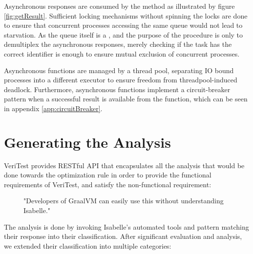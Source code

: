 Asynchronous responses are consumed by the  method as illustrated by figure \ref{fig:getResult}. Sufficient locking 
mechanisms without spinning the locks are done to ensure that concurrent processes accessing the same queue would not lead to starvation.
As the queue itself is a , and the purpose of the procedure is only to demultiplex the asynchronous responses, merely 
checking if the task has the correct identifier is enough to ensure mutual exclusion of concurrent processes.

Asynchronous functions are managed by a thread pool, separating IO bound processes into a different executor to ensure freedom from 
threadpool-induced deadlock. Furthermore, asynchronous functions implement a circuit-breaker pattern when a successful result is available 
from the function, which can be seen in appendix \ref{app:circuitBreaker}.

\section{Generating the Analysis}
\label{sec:generateAnalysis}

VeriTest provides RESTful API that encapsulates all the analysis that would be done towards the optimization rule 
in order to provide the functional requirements of VeriTest, and satisfy the non-functional requirement:

\begin{figure}[h]
    \centering
    "Developers of GraalVM can easily use this without understanding Isabelle."
\end{figure}

The analysis is done by invoking Isabelle's automated tools and pattern matching their response into their classification. After significant 
evaluation and analysis, we extended their classification into multiple categories:

